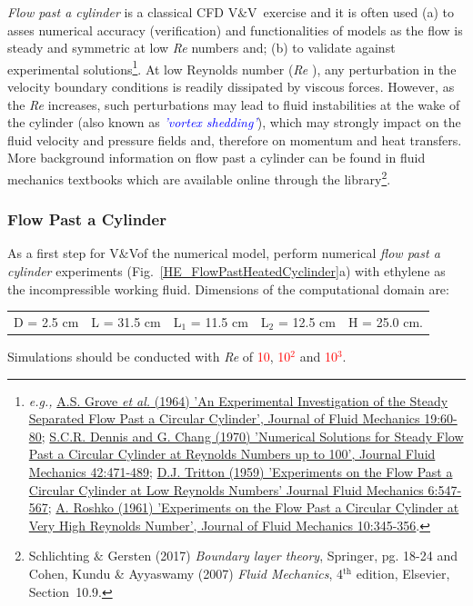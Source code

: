 \documentclass[12pts,a4paper,amsmath,amssymb,floatfix]{article}%
\newcommand{\red}{\textcolor{red}}
\newcommand{\blue}{\textcolor{blue}}
\newcommand{\eg}{{\it e.g., }}
\newcommand\Rey{\mbox{\textit{Re}}\,\,}
\newcommand{\vv}{V$\&$V}
\begin{document}
                {\it Flow past a cylinder} is a classical CFD \vv~exercise and it is often used (a) to asses numerical accuracy (verification) and functionalities of models as the flow is steady and symmetric at low \Rey numbers and; (b) to validate against experimental solutions\footnote{\eg \href{https://doi.org/10.1017/S0022112064000544}{A.S. Grove {\it et al.} (1964) 'An Experimental Investigation of the Steady Separated Flow Past a Circular Cylinder', Journal of Fluid Mechanics 19:60-80}; \href{https://doi.org/10.1017/S0022112070001428}{S.C.R. Dennis and G. Chang (1970) 'Numerical Solutions for Steady Flow Past a Circular Cylinder at Reynolds Numbers up to 100', Journal Fluid Mechanics 42:471-489}; \href{https://doi.org/10.1017/S0022112059000829}{D.J. Tritton (1959) 'Experiments on the Flow Past a Circular Cylinder at Low Reynolds Numbers'  Journal Fluid Mechanics 6:547-567}; \href{https://doi.org/10.1017/S0022112061000950}{A. Roshko (1961) 'Experiments on the Flow Past a Circular Cylinder at Very High Reynolds Number', Journal of Fluid Mechanics 10:345-356}.}. At low Reynolds number (\Rey), any perturbation in the velocity boundary conditions is readily dissipated by viscous forces. However, as the \Rey increases, such perturbations may lead to fluid instabilities at the wake of the cylinder (also known as \blue{\it 'vortex shedding'}), which may strongly impact on the fluid velocity and pressure fields and, therefore on momentum and heat transfers. More background information on flow past a cylinder can be found in fluid mechanics textbooks which are available online through the library\footnote{Schlichting $\&$ Gersten (2017) \emph{Boundary layer theory}, Springer, pg. 18-24 and Cohen, Kundu \& Ayyaswamy (2007) \emph{Fluid Mechanics}, 4$^{\text{th}}$ edition, Elsevier, Section~10.9.}.

     \subsubsection{Flow Past a Cylinder}\label{FlowPastCylinder}
     As a first step for \vv of the numerical model, perform numerical {\it flow past a cylinder} experiments (Fig.~\ref{HE_FlowPastHeatedCyclinder}a) with ethylene as the incompressible working fluid. Dimensions of the computational domain are:
     \begin{center}
       \begin{tabular}{c c c c c}
            D = 2.5 cm & L = 31.5 cm & L$_{1}$ = 11.5 cm & L$_{2}$ = 12.5 cm & H = 25.0 cm.
       \end{tabular}
     \end{center}
     Simulations should be conducted with \Rey of \red{10}, \red{10$^{2}$} and \red{10$^{3}$}.
\end{document}

